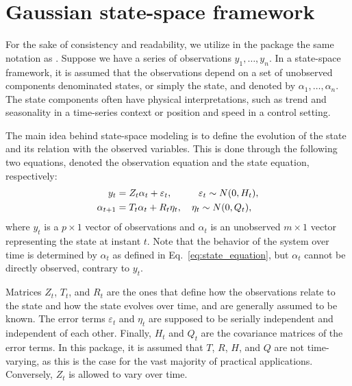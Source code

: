 \documentclass{juliacon}
\begin{document}
\section{Gaussian state-space framework} \label{sec:statespace}

For the sake of consistency and readability, we utilize in the package the same notation as \cite{durbin2012time}. Suppose we have a series of observations $y_{1}, \dots, y_{n}$. In a state-space framework, it is assumed that the observations depend on a set of unobserved components denominated states, or simply the state, and denoted by $\alpha_{1}, \dots, \alpha_{n}$. The state components often have physical interpretations, such as trend and seasonality in a time-series context or position and speed in a control setting.

The main idea behind state-space modeling is to define the evolution of the state and its relation with the observed variables. This is done through the following two equations, denoted the observation equation and the state equation, respectively:
%
\begin{align}
    y_{t} &= Z_{t} \alpha_{t} + \varepsilon_{t}, \hspace{0.08\columnwidth} \varepsilon_{t} \sim N(0, H_{t}), \label{eq:obs_equation} \\
    \alpha_{t+1} &= T_{t} \alpha_{t} + R_{t} \eta_{t}, \quad \eta_{t} \sim N(0, Q_{t}), \label{eq:state_equation}
\end{align}
%
\noindent where $y_{t}$ is a $p \times 1$ vector of observations and $\alpha_{t}$ is an unobserved $m \times 1$ vector representing the state at instant $t$. Note that the behavior of the system over time is determined by $\alpha_{t}$ as defined in \mbox{Eq. \eqref{eq:state_equation}}, but $\alpha_{t}$ cannot be directly observed, contrary to $y_{t}$.

Matrices $Z_{t}$, $T_{t}$, and $R_{t}$ are the ones that define how the observations relate to the state and how the state evolves over time, and are generally assumed to be known. The error terms $\varepsilon_{t}$ and $\eta_{t}$ are supposed to be serially independent and independent of each other. Finally, $H_{t}$ and $Q_{t}$ are the covariance matrices of the error terms. In this package, it is assumed that $T$, $R$, $H$, and $Q$ are not time-varying, as this is the case for the vast majority of practical applications. Conversely, $Z_{t}$ is allowed to vary over time.
\end{document}
